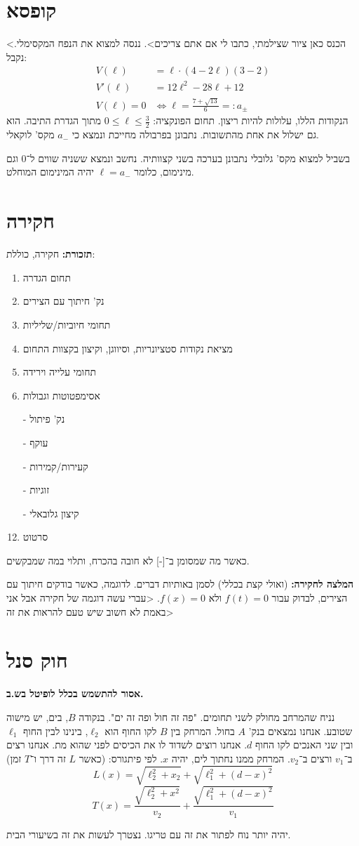 \documentclass[]{article}
\newcommand\ml    {\ell}
\begin{document}
	\section{קופסא}
	<הכנס כאן ציור שצילמתי, כתבו לי אם אתם צריכים>. ננסה למצוא את הנפח המקסימלי. 
	נקבל: 
	\begin{align*}
		V(\ml) &= \ml \cdot (4 - 2\ml)(3 - 2)\\
		V'(\ell) &= 12\ell^2 - 28 \ml + 12 \\
		V(\ml) = 0 &\iff \ell = \frac{7 + \sqrt{13}}{6} =: a_\pm
	\end{align*}
	הנקודות הללו, עלולות להיות ריצון. תחום הפונקציה: $0 \le \ml \le \frac{3}{2}$ מתוך הגדרת התיבה. הוא גם ישלול את אחת מהתשובות. נתבונן בפרבולה מחייכת ונמצא כי $a_-$ מקס' לוקאלי. 
	
	בשביל למצוא מקס' גלובלי נתבונן בערכה בשני קצוותיה. נחשב ונמצא ששניה שווים ל־$0$ וגם מינימום, כלומר $\ell = a_-$ יהיה המינימום המוחלט. 
	\section{חקירה}
	\textbf{תזכורת: }חקירה, כוללת: 
	\begin{enumerate}
		\item תחום הגדרה
		\item נק' חיתוך עם הצירים 
		\item תחומי חיוביות/שליליות
		\item מציאת נקודות סטציונריות, וסיווגן, וקיצון בקצוות התחום
		\item תחומי עלייה וירידה
		\item אסימפטוטות וגבולות
		\item [-] נק' פיתול
		\item [-] עוקף
		\item [-] קעירות/קמירות
		\item [-] זוגיות
		\item [-] קיצון גלובאלי
		\item סרטוט
	\end{enumerate}
	כאשר מה שמסומן ב־[-] לא חובה בהכרח, ותלוי במה שמבקשים. 
	
	\textbf{המלצה לחקירה: }(ואולי קצת בכללי) לסמן באותיות דברים. לדוגמה, כאשר בודקים חיתוך עם הצירים, לבדוק עבור $f(t) = 0$ ולא $f(x) = 0$. 
	<עברי עשה דוגמה של חקירה אבל אני באמת לא חשוב שיש טעם להראות את זה>
	\section{חוק סנל}
	\textbf{אסור להתשמש בכלל לופיטל בש.ב.}
	
	נניח שהמרחב מחולק לשני תחומים. "פה זה חול ופה זה ים". בנקודה $B$, בים, יש מישוה שטובע. אנחנו נמצאים בנק' $A$ בחול. 
	המרחק בין $B$ לקו החוף הוא $\ml_2$, בינינו לבין החוף $\ml_1$ ובין שני האנכים לקו החוף $d$. אנחנו רוצים לשדוד לו את הכיסים לפני שהוא מת. אנחנו רצים ב־$v_1$ ורצים ב־$v_2$. המרחק ממנו נחתוך לים, יהיה $x$. לפי פיתגורס: (כאשר $L$ זה דרך ו־$T$ זמן)
	\[ L(x) = \sqrt{\ell_2 ^2 + x_2} + \sqrt{\ml_1^2 + (d - x)^2} \]
	\[ T(x) = \frac{\sqrt{\ml_2^2 + x^2}}{v_2} + \frac{\sqrt{\ml_1^2 + (d - x)^2}}{v_1} \]
	
	יהיה יותר נוח לפתור את זה עם טריגו. נצטרך לעשות את זה בשיעורי הבית. 
\end{document}
